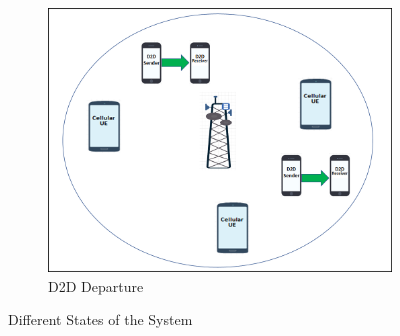 \documentclass[times]{dacauth}
\begin{document}
\begin{figure}[t]
{{%
			\begin{subfigure}{0.33\linewidth}
				\centering
				\includegraphics[width=\linewidth]{Graph/s5.png}
				\caption{D2D Departure}
				\label{fig:D2D departure}
			\end{subfigure}
			
		}
	}%
	\caption{Different States of the System}
	\label{fig:State of the System}
\end{figure}  

\end{document}
